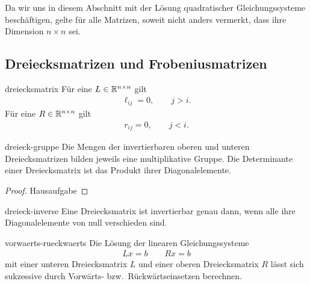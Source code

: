 \begin{notation}%
  Da wir uns in diesem Abschnitt mit der Lösung quadratischer
  Gleichungssysteme beschäftigen, gelte für alle Matrizen, soweit
  nicht anders vermerkt, dass ihre Dimension $n\times n$ sei.
\end{notation}

\subsection{Dreiecksmatrizen und Frobeniusmatrizen}

\begin{Definition}{dreiecksmatrix}
  Für eine  $L \in \mathbb R^{n\times n}$ gilt
  \begin{gather}
    \ell_{ij} = 0,\qquad j>i.
  \end{gather}
  Für eine  $R \in \mathbb R^{n\times n}$ gilt
  \begin{gather}
    r_{ij} = 0,\qquad j<i.
  \end{gather}
\end{Definition}

\begin{Satz}{dreieck-gruppe}
  Die Mengen der invertierbaren oberen und unteren Dreiecksmatrizen
  bilden jeweils eine multiplikative Gruppe. Die Determinante einer
  Dreiecksmatrix ist das Produkt ihrer Diagonalelemente.
\end{Satz}

\begin{proof}
  Hausaufgabe
\end{proof}

\begin{Korollar}{dreieck-inverse}
  Eine Dreiecksmatrix ist invertierbar genau dann, wenn alle ihre
  Diagonalelemente von null verschieden sind.
\end{Korollar}

\begin{Algorithmus}{vorwaerts-rueckwaerts}
  Die Lösung der linearen Gleichungssysteme
  \begin{gather}
    Lx = b \qquad Rx = b
  \end{gather}
  mit einer unteren Dreiecksmatrix $L$ und einer oberen Dreiecksmatrix
  $R$ lässt sich sukzessive durch Vorwärts- bzw.\ Rückwärtseinsetzen
  berechnen.
  \begin{minipage}[t]{.45\linewidth}
        
  \end{minipage}
  \begin{minipage}[t]{.45\linewidth}
        
  \end{minipage}
\end{Algorithmus}

